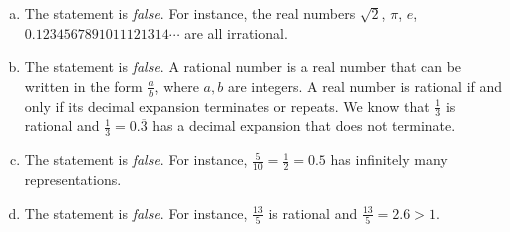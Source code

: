 \documentclass[11pt,letterpaper]{article}
\begin{document}
\sol 
\begin{enumerate}[(a)]
\item The statement is \textit{false}. For instance, the real numbers $\sqrt{2}$, $\pi$, $e$, $0.1234567891011121314\cdots$ are all irrational. \pspace

\item The statement is \textit{false}. A rational number is a real number that can be written in the form $\frac{a}{b}$, where $a, b$ are integers. A real number is rational if and only if its decimal expansion terminates or repeats. We know that $\frac{1}{3}$ is rational and $\frac{1}{3}= 0.\overline{3}$ has a decimal expansion that does not terminate. \pspace

\item The statement is \textit{false}. For instance, $\frac{5}{10}= \frac{1}{2}= 0.5$ has infinitely many representations. \pspace

\item The statement is \textit{false}. For instance, $\frac{13}{5}$ is rational and $\frac{13}{5}= 2.6 > 1$. 
\end{enumerate}
\end{document}
